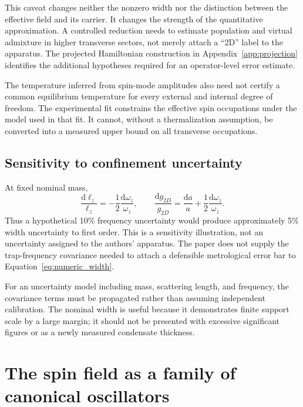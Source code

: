 \documentclass[11pt,a4paper]{article}
\theoremstyle{definition}
\theoremstyle{remark}
\newcommand{\dd}{\mathrm{d}}
\newcommand{\lop}{\ell_z}
\begin{document}
This caveat changes neither the nonzero width nor the distinction between the effective field and its carrier. It changes the strength of the quantitative approximation. A controlled reduction needs to estimate population and virtual admixture in higher transverse sectors, not merely attach a ``2D'' label to the apparatus. The projected Hamiltonian construction in Appendix~\ref{app:projection} identifies the additional hypotheses required for an operator-level error estimate.

The temperature inferred from spin-mode amplitudes also need not certify a common equilibrium temperature for every external and internal degree of freedom. The experimental fit constrains the effective spin occupations under the model used in that fit. It cannot, without a thermalization assumption, be converted into a measured upper bound on all transverse occupations.\cite{zhang2026}

\subsection{Sensitivity to confinement uncertainty}
At fixed nominal mass,
\begin{equation}
 \frac{\dd\lop}{\lop}=-\frac12\frac{\dd\omega_z}{\omega_z},
 \qquad
 \frac{\dd g_{2D}}{g_{2D}}
 =\frac{\dd a}{a}+\frac12\frac{\dd\omega_z}{\omega_z}.
 \label{eq:sensitivity}
\end{equation}
Thus a hypothetical 10\% frequency uncertainty would produce approximately 5\% width uncertainty to first order. This is a sensitivity illustration, not an uncertainty assigned to the authors' apparatus. The paper does not supply the trap-frequency covariance needed to attach a defensible metrological error bar to Equation~\eqref{eq:numeric_width}.

For an uncertainty model including mass, scattering length, and frequency, the covariance terms must be propagated rather than assuming independent calibration. The nominal width is useful because it demonstrates finite support scale by a large margin; it should not be presented with excessive significant figures or as a newly measured condensate thickness.

\section{The spin field as a family of canonical oscillators}
\label{sec:spin}
\end{document}
